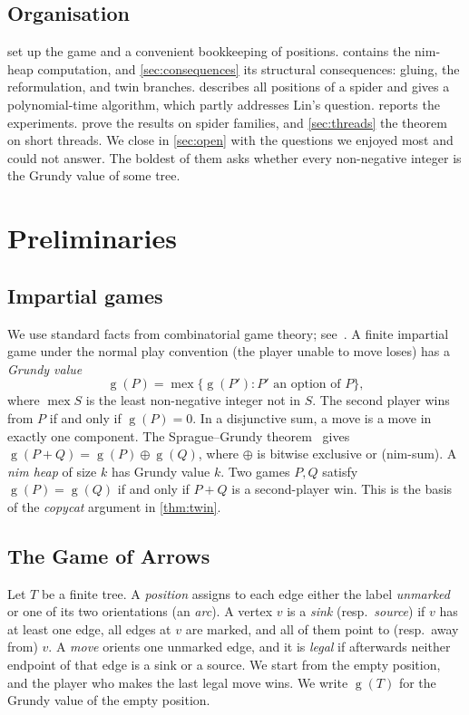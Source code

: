 \documentclass[11pt]{amsart}
\theoremstyle{definition}
\theoremstyle{remark}
\newcommand{\gv}{\operatorname{g}}           %
\newcommand{\mex}{\operatorname{mex}}
\begin{document}
\subsection*{Organisation}
 set up the game and a convenient bookkeeping of positions.  contains the nim-heap computation, and \cref{sec:consequences} its structural consequences: gluing, the reformulation, and twin branches.  describes all positions of a spider and gives a polynomial-time algorithm, which partly addresses Lin's question.  reports the experiments.  prove the results on spider families, and \cref{sec:threads} the theorem on short threads. We close in \cref{sec:open} with the questions we enjoyed most and could not answer. The boldest of them asks whether every non-negative integer is the Grundy value of some tree.

\section{Preliminaries}\label{sec:prelim}

\subsection{Impartial games}
We use standard facts from combinatorial game theory; see~\cite{WinningWays,LessonsInPlay,Siegel2013}. A finite impartial game under the normal play convention (the player unable to move loses) has a \emph{Grundy value}
\[
  \gv(P)=\mex\{\gv(P') : P' \text{ an option of } P\},
\]
where $\mex S$ is the least non-negative integer not in $S$. The second player wins from $P$ if and only if $\gv(P)=0$. In a disjunctive sum, a move is a move in exactly one component. The Sprague--Grundy theorem~\cite{Sprague1935,Grundy1939} gives $\gv(P+Q)=\gv(P)\oplus\gv(Q)$, where $\oplus$ is bitwise exclusive or (nim-sum). A \emph{nim heap} of size $k$ has Grundy value $k$. Two games $P,Q$ satisfy $\gv(P)=\gv(Q)$ if and only if $P+Q$ is a second-player win. This is the basis of the \emph{copycat} argument in \cref{thm:twin}.

\subsection{The Game of Arrows}
Let $T$ be a finite tree. A \emph{position} assigns to each edge either the label \emph{unmarked} or one of its two orientations (an \emph{arc}). A vertex $v$ is a \emph{sink} (resp.\ \emph{source}) if $v$ has at least one edge, all edges at $v$ are marked, and all of them point to (resp.\ away from) $v$. A \emph{move} orients one unmarked edge, and it is \emph{legal} if afterwards neither endpoint of that edge is a sink or a source. We start from the empty position, and the player who makes the last legal move wins. We write $\gv(T)$ for the Grundy value of the empty position.
\end{document}

